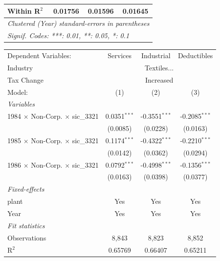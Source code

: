 \documentclass[
  12pt]{article}
\theoremstyle{definition}
\theoremstyle{remark}
\begin{document}
\begin{table}
\begin{minipage}{\linewidth}
\begin{tabular}{lccc}
   Within R$^2$                                  & 0.01756        & 0.01596         & 0.01645\\  
   \midrule \midrule
   \multicolumn{4}{l}{\emph{Clustered (Year) standard-errors in parentheses}}\\
   \multicolumn{4}{l}{\emph{Signif. Codes: ***: 0.01, **: 0.05, *: 0.1}}\\
\end{tabular}
\par\endgroup
\begingroup
\centering
\begin{tabular}{lccc}
   \tabularnewline \midrule \midrule
   Dependent Variables:                          & Services       & Industrial      & Deductibles\\  
   Industry & \multicolumn{3}{c}{Textiles...} \\ 
   Tax Change & \multicolumn{3}{c}{Increased} \\ 
   Model:                                        & (1)            & (2)             & (3)\\  
   \midrule
   \emph{Variables}\\
   1984 $\times$ Non-Corp. $\times$ sic\_3321    & 0.0351$^{***}$ & -0.3551$^{***}$ & -0.2085$^{***}$\\   
                                                 & (0.0085)       & (0.0228)        & (0.0163)\\   
   1985 $\times$ Non-Corp. $\times$ sic\_3321    & 0.1174$^{***}$ & -0.4322$^{***}$ & -0.2210$^{***}$\\   
                                                 & (0.0142)       & (0.0362)        & (0.0294)\\   
   1986 $\times$ Non-Corp. $\times$ sic\_3321    & 0.0792$^{***}$ & -0.4998$^{***}$ & -0.1356$^{***}$\\   
                                                 & (0.0163)       & (0.0398)        & (0.0377)\\   
   \midrule
   \emph{Fixed-effects}\\
   plant                                         & Yes            & Yes             & Yes\\  
   Year                                          & Yes            & Yes             & Yes\\  
   \midrule
   \emph{Fit statistics}\\
   Observations                                  & 8,843          & 8,823           & 8,852\\  
   R$^2$                                         & 0.65769        & 0.66407         & 0.65211\\  

\end{tabular}
\end{minipage}
\end{table}
\end{document}
